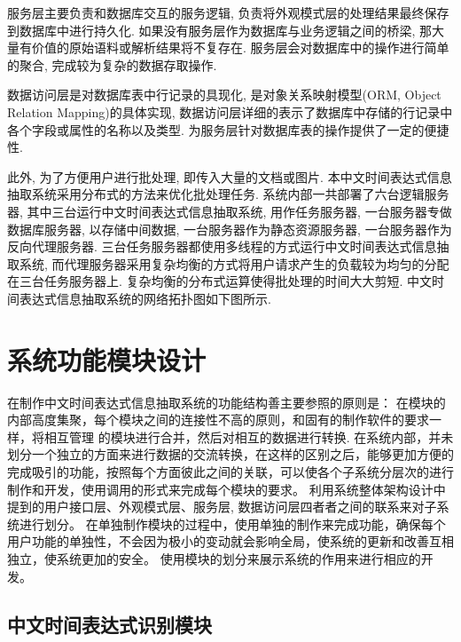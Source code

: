 服务层主要负责和数据库交互的服务逻辑, 负责将外观模式层的处理结果最终保存到数据库中进行持久化.
如果没有服务层作为数据库与业务逻辑之间的桥梁, 那大量有价值的原始语料或解析结果将不复存在.
服务层会对数据库中的操作进行简单的聚合, 完成较为复杂的数据存取操作.

数据访问层是对数据库表中行记录的具现化, 是对象关系映射模型(ORM, Object Relation Mapping)的具体实现, 数据访问层详细的表示了数据库中存储的行记录中各个字段或属性的名称以及类型.
为服务层针对数据库表的操作提供了一定的便捷性.

此外, 为了方便用户进行批处理, 即传入大量的文档或图片. 本中文时间表达式信息抽取系统采用分布式的方法来优化批处理任务.
系统内部一共部署了六台逻辑服务器, 其中三台运行中文时间表达式信息抽取系统, 用作任务服务器, 一台服务器专做数据库服务器, 以存储中间数据, 一台服务器作为静态资源服务器, 一台服务器作为反向代理服务器.
三台任务服务器都使用多线程的方式运行中文时间表达式信息抽取系统, 而代理服务器采用复杂均衡的方式将用户请求产生的负载较为均匀的分配在三台任务服务器上. 复杂均衡的分布式运算使得批处理的时间大大剪短.
中文时间表达式信息抽取系统的网络拓扑图如下图所示.


\section{系统功能模块设计}

在制作中文时间表达式信息抽取系统的功能结构善主要参照的原则是：
在模块的内部高度集聚，每个模块之间的连接性不高的原则，和固有的制作软件的要求一样，将相互管理
的模块进行合并，然后对相互的数据进行转换.
在系统内部，并未划分一个独立的方面来进行数据的交流转换，在这样的区别之后，能够更加方便的完成吸引的功能，按照每个方面彼此之间的关联，可以使各个子系统分层次的进行制作和开发，使用调用的形式来完成每个模块的要求。
利用系统整体架构设计中提到的用户接口层、外观模式层、服务层, 数据访问层四者者之间的联系来对子系统进行划分。
在单独制作模块的过程中，使用单独的制作来完成功能，确保每个用户功能的单独性，不会因为极小的变动就会影响全局，使系统的更新和改善互相独立，使系统更加的安全。
使用模块的划分来展示系统的作用来进行相应的开发。


\subsection{中文时间表达式识别模块}

